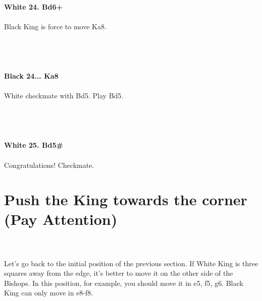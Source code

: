 \documentclass{article}
\begin{document}
\textbf{White 24. Bd6+}\\
\\
Black King is force to move Ka8.\\\\
\\

\\
\\
\textbf{Black 24... Ka8}\\
\\
White checkmate with Bd5. Play Bd5.\\\\
\\

\\
\\
\textbf{White 25. Bd5\#}\\
\\
Congratulations! Checkmate.\\\section{ Push the King towards the corner (Pay Attention)}

\\
\\
Let's go back to the initial position of the previous section. If White King is three squares away from the edge, it's better to move it on the other side of the Bishops. In this position, for example, you should move it in e5, f5, g6. Black King can only move in e8-f8.\\
\end{document}
